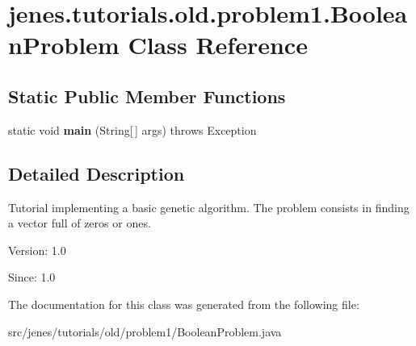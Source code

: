 \hypertarget{classjenes_1_1tutorials_1_1old_1_1problem1_1_1_boolean_problem}{
\section{jenes.tutorials.old.problem1.BooleanProblem Class Reference}
\label{classjenes_1_1tutorials_1_1old_1_1problem1_1_1_boolean_problem}
}
\subsection*{Static Public Member Functions}
\begin{CompactItemize}
\item 
\hypertarget{classjenes_1_1tutorials_1_1old_1_1problem1_1_1_boolean_problem_122005d28decbbdf9c0676bc5870dfd4}{
static void \textbf{main} (String\mbox{[}$\,$\mbox{]} args)  throws Exception }
\label{classjenes_1_1tutorials_1_1old_1_1problem1_1_1_boolean_problem_122005d28decbbdf9c0676bc5870dfd4}

\end{CompactItemize}


\subsection{Detailed Description}
Tutorial implementing a basic genetic algorithm. The problem consists in finding a vector full of zeros or ones.

\begin{Desc}
\item[Version:]1.0\end{Desc}
\begin{Desc}
\item[Since:]1.0 \end{Desc}


The documentation for this class was generated from the following file:\begin{CompactItemize}
\item 
src/jenes/tutorials/old/problem1/BooleanProblem.java\end{CompactItemize}
